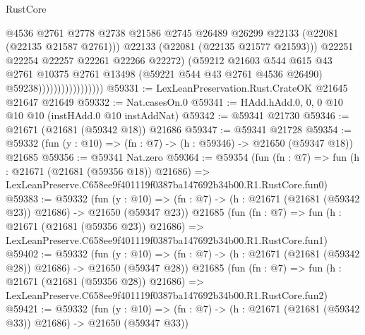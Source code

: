 \begin{lexlean}{RustCore}
\begin{coremodule}
                                          @4536
                                          @2761
                                          @2778
                                          @2738
                                          @21586
                                          @2745
                                          @26489
                                          @26299
                                          @22133
                                          (@22081 (@22135 @21587 @2761)))
                                        @22133
                                        (@22081 (@22135 @21577 @21593)))
                                      @22251
                                      @22254
                                      @22257
                                      @22261
                                      @22266
                                      @22272)
                                    (@59212
                                      @21603
                                      @544
                                      @615
                                      @43
                                      @2761
                                      @10375
                                      @2761
                                      @13498
                                      (@59221 @544 @43 @2761 @4536 @26490)
                                      @59238)))))))))))))))))
@59331 := LexLeanPreservation.Rust.CrateOK @21645 @21647 @21649
@59332 := Nat.casesOn.{0}
@59341 := HAdd.hAdd.{0, 0, 0} @10 @10 @10 (instHAdd.{0} @10 instAddNat)
@59342 := @59341 @21730
@59346 := @21671 (@21681 (@59342 @18)) @21686
@59347 := @59341 @21728
@59354 := @59332 (fun (y : @10) => (fn : @7) -> (h : @59346) -> @21650 (@59347 @18)) @21685
@59356 := @59341 Nat.zero
@59364 := @59354
    (fun (fn : @7) =>
    fun (h : @21671 (@21681 (@59356 @18)) @21686) =>
    LexLeanPreserve.C658ee9f401119f0387ba147692b34b00.R1.RustCore.fun0)
@59383 := @59332
    (fun (y : @10) => (fn : @7) -> (h : @21671 (@21681 (@59342 @23)) @21686) -> @21650 (@59347 @23))
    @21685
    (fun (fn : @7) =>
    fun (h : @21671 (@21681 (@59356 @23)) @21686) =>
    LexLeanPreserve.C658ee9f401119f0387ba147692b34b00.R1.RustCore.fun1)
@59402 := @59332
    (fun (y : @10) => (fn : @7) -> (h : @21671 (@21681 (@59342 @28)) @21686) -> @21650 (@59347 @28))
    @21685
    (fun (fn : @7) =>
    fun (h : @21671 (@21681 (@59356 @28)) @21686) =>
    LexLeanPreserve.C658ee9f401119f0387ba147692b34b00.R1.RustCore.fun2)
@59421 := @59332
    (fun (y : @10) => (fn : @7) -> (h : @21671 (@21681 (@59342 @33)) @21686) -> @21650 (@59347 @33))

\end{coremodule}
\end{lexlean}
